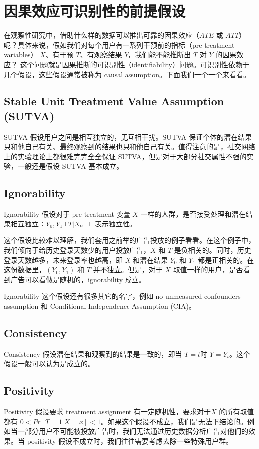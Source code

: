 \documentclass[12pt]{article}
\begin{document}
\section{因果效应可识别性的前提假设}
在观察性研究中，借助什么样的数据可以推出可靠的因果效应（$ATE$ 或 $ATT$）呢？具体来说，假如我们对每个用户有一系列干预前的指标（pre-treatment variables） $X$、有干预 $T$、有观察结果 $Y$，我们能不能推断出 $T$ 对 $Y$ 的因果效应？
这个问题就是因果推断的可识别性（identifiability）问题。可识别性依赖于几个假设，这些假设通常被称为 causal assumption。下面我们一个一个来看看。

\subsection{Stable Unit Treatment Value Assumption (SUTVA)}
SUTVA 假设用户之间是相互独立的，无互相干扰。SUTVA 保证个体的潜在结果只和他自己有关、最终观察到的结果也只和他自己有关。值得注意的是，社交网络上的实验理论上都很难完完全全保证 SUTVA，但是对于大部分社交属性不强的实验，一般还是假设 SUTVA 基本成立。

\subsection{Ignorability}
Ignorability 假设对于 pre-treatment 变量 $X$ 一样的人群，是否接受处理和潜在结果相互独立：$Y_0, Y_1 \bot T|X$。$\bot$ 表示独立性。

这个假设比较难以理解，我们套用之前举的广告投放的例子看看。在这个例子中，我们倾向于给历史登录天数少的用户投放广告，$X$ 和 $T$ 是负相关的。同时，历史登录天数越多，未来登录率也越高，即 $X$ 和潜在结果 $Y_0$ 和 $Y_1$ 都是正相关的。在这份数据里，$(Y_0, Y_1)$ 和 $T$ 并不独立。但是，对于 $X$ 取值一样的用户，是否看到广告可以看做是随机的，ignorability 成立。

Ignorability 这个假设还有很多其它的名字，例如 no unmeasured confounders assumption 和 Conditional Independence Assumption (CIA)。

\subsection{Consistency}
Consistency 假设潜在结果和观察到的结果是一致的，即当 $T = t$时 $Y = Y_t$。这个假设一般可以认为是成立的。

\subsection{Positivity}
Positivity 假设要求 treatment assignment 有一定随机性，要求对于$X$ 的所有取值都有 $ 0 < Pr[T=1|X=x] < 1$。如果这个假设不成立，我们是无法下结论的。例如当一部分用户不可能被投放广告时，我们无法通过历史数据分析广告对他们的效果。当 positivity 假设不成立时，我们往往需要考虑去除一些特殊用户群。
\end{document}
